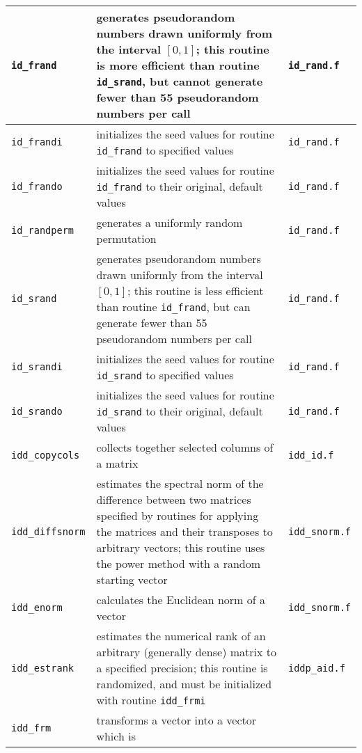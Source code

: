 \documentclass[letterpaper,12pt]{article}
\begin{document}
\begin{center}
%
\tabletail{\hline}
%
\begin{supertabular}{>{\raggedright}p{1.2in} p{.53\textwidth} l}
%
\hline
{\tt id\_frand} & generates pseudorandom numbers drawn uniformly from
the interval $[0,1]$; this routine is more efficient than routine
{\tt id\_srand}, but cannot generate fewer than 55 pseudorandom numbers
per call & {\tt id\_rand.f} \\\hline
%
{\tt id\_frandi} & initializes the seed values for routine
{\tt id\_frand} to specified values & {\tt id\_rand.f} \\\hline
%
{\tt id\_frando} & initializes the seed values for routine
{\tt id\_frand} to their original, default values & {\tt id\_rand.f}
\\\hline
%
{\tt id\_randperm} & generates a uniformly random permutation &
{\tt id\_rand.f} \\\hline
%
{\tt id\_srand} & generates pseudorandom numbers drawn uniformly from
the interval $[0,1]$; this routine is less efficient than routine
{\tt id\_frand}, but can generate fewer than 55 pseudorandom numbers
per call & {\tt id\_rand.f} \\\hline
%
{\tt id\_srandi} & initializes the seed values for routine
{\tt id\_srand} to specified values & {\tt id\_rand.f} \\\hline
%
{\tt id\_srando} & initializes the seed values for routine
{\tt id\_srand} to their original, default values & {\tt id\_rand.f}
\\\hline
%
{\tt idd\_copycols} & collects together selected columns of a matrix &
{\tt idd\_id.f} \\\hline
%
{\tt idd\_diffsnorm} & estimates the spectral norm of the difference
between two matrices specified by routines for applying the matrices
and their transposes to arbitrary vectors; this routine uses the power
method with a random starting vector & {\tt idd\_snorm.f} \\\hline
%
{\tt idd\_enorm} & calculates the Euclidean norm of a vector &
{\tt idd\_snorm.f} \\\hline
%
{\tt idd\_estrank} & estimates the numerical rank of an arbitrary
(generally dense) matrix to a specified precision; this routine is
randomized, and must be initialized with routine {\tt idd\_frmi} &
{\tt iddp\_aid.f} \\\hline
%
{\tt idd\_frm} & transforms a vector into a vector which is

\end{supertabular}
\end{center}
\end{document}
